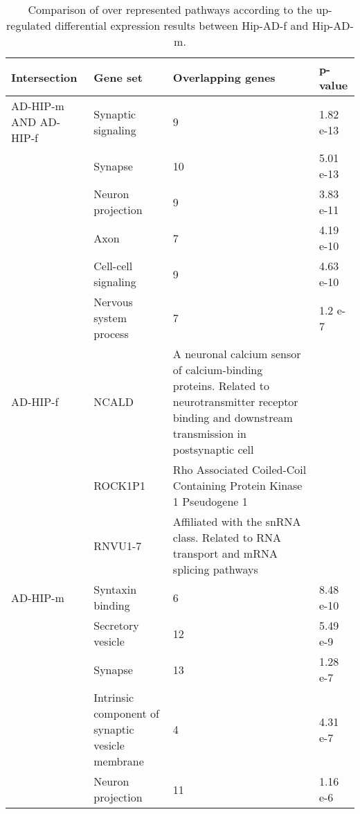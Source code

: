 \begin{table}[!ht]
\centering
\caption{Comparison of over represented pathways according to the up-regulated differential expression results between Hip-AD-f and Hip-AD-m.}
\begin{tabularx}{1.0\textwidth}{L{2cm}L{2.4cm}L{8.1cm}C{1.5cm}}
\toprule
\textbf{Intersection} & \textbf{Gene set} & \textbf{Overlapping genes} & \textbf{p-value} \\
\midrule
AD-HIP-m AND AD-HIP-f &
  Synaptic signaling &
  9 &
  1.82 e-13 \\
 &
  Synapse &
  10 &
  5.01 e-13 \\
 &
  Neuron projection &
  9 &
  3.83 e-11 \\
 &
  Axon &
  7 &
  4.19 e-10 \\
 &
  Cell-cell signaling &
  9 &
  4.63 e-10 \\
 &
  Nervous system process &
  7 &
  1.2 e-7 \\
AD-HIP-f &
  NCALD &
  A neuronal calcium sensor of calcium-binding proteins. Related to neurotransmitter receptor binding and downstream transmission in postsynaptic cell &
   \\
 &
  ROCK1P1 &
  Rho Associated Coiled-Coil Containing Protein Kinase 1 Pseudogene 1 &
   \\
 &
  RNVU1-7 &
  Affiliated with the snRNA class. Related to RNA transport and mRNA splicing pathways &
   \\
AD-HIP-m &
  Syntaxin binding &
  6 &
  8.48 e-10 \\
 &
  Secretory vesicle &
  12 &
  5.49 e-9 \\
 &
  Synapse &
  13 &
  1.28 e-7 \\
 &
  Intrinsic component of synaptic vesicle membrane &
  4 &
  4.31 e-7 \\
 &
  Neuron projection &
  11 &
  1.16 e-6 \\
\bottomrule

\end{tabularx}
\end{table}


